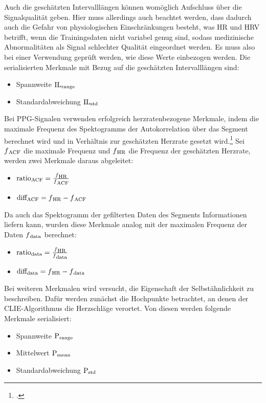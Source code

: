 Auch die geschätzten Intervalllängen können womöglich Aufschluss über die Signalqualität geben. Hier muss allerdings auch beachtet werden, dass dadurch auch die Gefahr von physiologischen Einschränkungen besteht, was \acl{HR} und \acl{HRV} betrifft, wenn die Trainingsdaten nicht variabel genug sind, sodass medizinische Abnormalitäten als Signal schlechter Qualität eingeordnet werden. Es muss also bei einer Verwendung geprüft werden, wie diese Werte einbezogen werden. Die serialisierten Merkmale mit Bezug auf die geschätzten Intervalllängen sind:

\begin{itemize}
	\item Spannweite $\text{IL}\textsubscript{range}$
	\item Standardabweichung $\text{IL}\textsubscript{std}$
\end{itemize}

Bei \ac{PPG}-Signalen verwenden \citeauthor{Yu2020} erfolgreich herzratenbezogene Merkmale, indem die maximale Frequenz des Spektogramms der Autokorrelation über das Segment berechnet wird und in Verhältnis zur geschätzten Herzrate gesetzt wird.\footcite{Yu2020} Sei $f\textsubscript{ACF}$ die maximale Frequenz und $f\textsubscript{HR}$ die Frequenz der geschätzten Herzrate, werden zwei Merkmale daraus abgeleitet:
\begin{itemize}
 	\item $\text{ratio}\textsubscript{ACF} = \frac{f\textsubscript{HR}}{f\textsubscript{ACF}}$
 	\item $\text{diff}\textsubscript{ACF} = f\textsubscript{HR} - f\textsubscript{ACF}$
\end{itemize}
 
 Da auch das Spektogramm der gefilterten Daten des Segments Informationen liefern kann, wurden diese Merkmale analog mit der maximalen Frequenz der Daten $f\textsubscript{data}$ berechnet:
 \begin{itemize}
 	\item $\text{ratio}\textsubscript{data} = \frac{f\textsubscript{HR}}{f\textsubscript{data}}$
 	\item $\text{diff}\textsubscript{data} = f\textsubscript{HR} - f\textsubscript{data}$
 \end{itemize}

Bei weiteren Merkmalen wird versucht, die Eigenschaft der Selbstähnlichkeit zu beschreiben. Dafür werden zunächst die Hochpunkte betrachtet, an denen der \ac{CLIE}-Algorithmus die Herzschläge verortet. Von diesen werden folgende Merkmale serialisiert:
\begin{itemize}
	\item Spannweite $\text{P}\textsubscript{range}$
	\item Mittelwert $\text{P}\textsubscript{mean}$
	\item Standardabweichung $\text{P}\textsubscript{std}$
\end{itemize}

